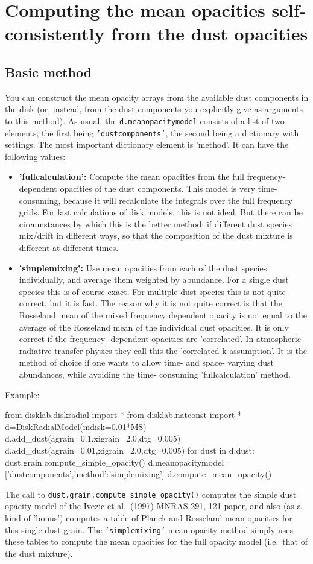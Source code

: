 \documentclass{book}
\newcommand{\code}[1]{{\small\tt #1}}
\begin{document}
\section{Computing the mean opacities self-consistently from the dust opacities}
\label{sec-mean-opac-from-dust-opac}
%
\subsection{Basic method}
You can construct the mean opacity arrays from the available dust components in
the disk (or, instead, from the dust components you explicitly give as arguments
to this method). As usual, the \code{d.meanopacitymodel} consists of a list of
two elements, the first being \code{'dustcomponents'}, the second being a
dictionary with settings. The most important dictionary element is 'method'. It
can have the following values:
\begin{itemize}
\item {\bf 'fullcalculation':} Compute the mean opacities from the full
  frequency-dependent opacities of the dust components.  This model is very
  time-consuming, because it will recalculate the integrals over the full
  frequency grids.  For fast calculations of disk models, this is not ideal.
  But there can be circumstances by which this is the better method: if
  different dust species mix/drift in different ways, so that the composition of
  the dust mixture is different at different times.
\item {\bf 'simplemixing':} Use mean opacities from each of the dust species
  individually, and average them weighted by abundance.  For a single dust
  species this is of course exact.  For multiple dust species this is not quite
  correct, but it is fast. The reason why it is not quite correct is that the
  Rosseland mean of the mixed frequency dependent opacity is not equal to the
  average of the Rosseland mean of the individual dust opacities. It is only
  correct if the frequency- dependent opacities are 'correlated'. In atmospheric
  radiative transfer physics they call this the 'correlated k assumption'. It is
  the method of choice if one wants to allow time- and space- varying dust
  abundances, while avoiding the time- consuming 'fullcalculation' method.
\end{itemize}
Example:
\begin{codebox}
from disklab.diskradial import *
from disklab.natconst import *
d=DiskRadialModel(mdisk=0.01*MS)
d.add_dust(agrain=0.1,xigrain=2.0,dtg=0.005)
d.add_dust(agrain=0.01,xigrain=2.0,dtg=0.005)
for dust in d.dust:
   dust.grain.compute_simple_opacity()
d.meanopacitymodel = ['dustcomponents',{'method':'simplemixing'}]
d.compute_mean_opacity()
\end{codebox}
The call to \code{dust.grain.compute\_simple\_opacity()} computes the
simple dust opacity model of the Ivezic et al.~(1997) MNRAS 291, 121 paper,
and also (as a kind of 'bonus') computes a table of Planck and Rosseland
mean opacities for this single dust grain. The \code{'simplemixing'}
mean opacity method simply uses these tables to compute the mean opacities
for the full opacity model (i.e.~that of the dust mixture).
\end{document}
